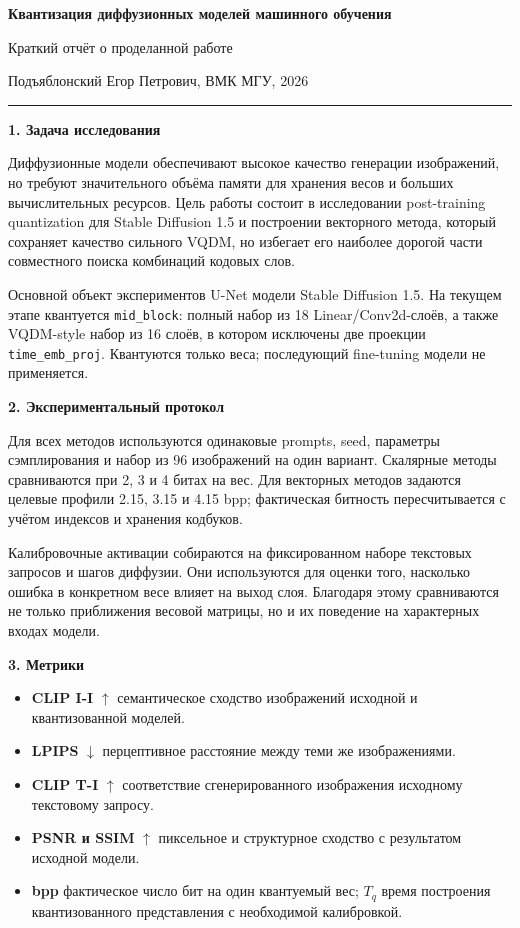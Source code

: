 \documentclass[11pt,a4paper]{article}
\newcommand{\doctitle}[1]{%
  {\centering
    {\fontsize{18}{21}\selectfont\bfseries\color{msublue} #1\par}
    \vspace{0.18cm}
    {\large Краткий отчёт о проделанной работе\par}
    \vspace{0.12cm}
    {\normalsize Подъяблонский Егор Петрович, ВМК МГУ, 2026\par}
    \vspace{0.25cm}
    \color{msured}\rule{\textwidth}{0.8pt}\par
  }
}
\newcommand{\sectiontitle}[1]{%
  \vspace{0.18cm}
  {\large\bfseries\color{msublue} #1}\par\vspace{0.08cm}
}
\begin{document}
\pagestyle{plain}

\doctitle{Квантизация диффузионных моделей машинного обучения}

\sectiontitle{1. Задача исследования}

Диффузионные модели обеспечивают высокое качество генерации изображений, но требуют значительного объёма памяти для хранения весов и больших вычислительных ресурсов. Цель работы состоит в исследовании post-training quantization для Stable Diffusion 1.5 и построении векторного метода, который сохраняет качество сильного VQDM, но избегает его наиболее дорогой части \textemdash{} совместного поиска комбинаций кодовых слов.

Основной объект экспериментов \textemdash{} U-Net модели Stable Diffusion 1.5. На текущем этапе квантуется \texttt{mid\_block}: полный набор из 18 Linear/Conv2d-слоёв, а также VQDM-style набор из 16 слоёв, в котором исключены две проекции \texttt{time\_emb\_proj}. Квантуются только веса; последующий fine-tuning модели не применяется.

\sectiontitle{2. Экспериментальный протокол}

Для всех методов используются одинаковые prompts, seed, параметры сэмплирования и набор из 96 изображений на один вариант. Скалярные методы сравниваются при 2, 3 и 4 битах на вес. Для векторных методов задаются целевые профили 2.15, 3.15 и 4.15 bpp; фактическая битность пересчитывается с учётом индексов и хранения кодбуков.

Калибровочные активации собираются на фиксированном наборе текстовых запросов и шагов диффузии. Они используются для оценки того, насколько ошибка в конкретном весе влияет на выход слоя. Благодаря этому сравниваются не только приближения весовой матрицы, но и их поведение на характерных входах модели.

\sectiontitle{3. Метрики}

\begin{itemize}\setlength\itemsep{0.12cm}\setlength\topsep{0.06cm}
  \item \textbf{CLIP I-I} $\uparrow$ \textemdash{} семантическое сходство изображений исходной и квантизованной моделей.
  \item \textbf{LPIPS} $\downarrow$ \textemdash{} перцептивное расстояние между теми же изображениями.
  \item \textbf{CLIP T-I} $\uparrow$ \textemdash{} соответствие сгенерированного изображения исходному текстовому запросу.
  \item \textbf{PSNR и SSIM} $\uparrow$ \textemdash{} пиксельное и структурное сходство с результатом исходной модели.
  \item \textbf{bpp} \textemdash{} фактическое число бит на один квантуемый вес; \textbf{$T_q$} \textemdash{} время построения квантизованного представления с необходимой калибровкой.
\end{itemize}
\end{document}
